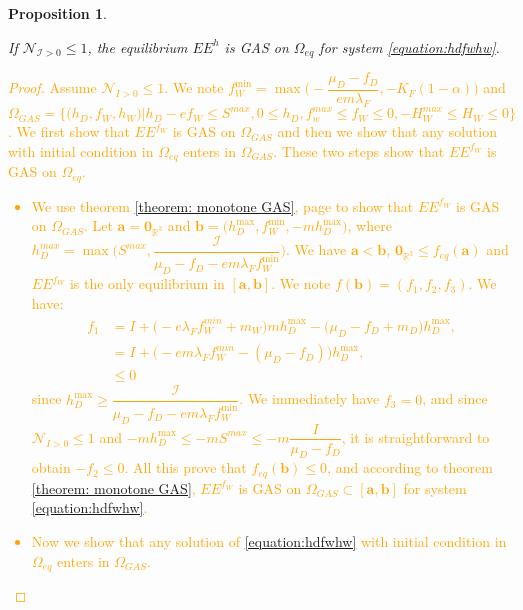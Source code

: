 \documentclass{article}
\newcommand{\lfw}{\lambda_{F}}
\newcommand{\lfw}{\lambda_{F}}
\newcommand{\cI}{\mathcal{I}}
\newcommand{\R}{\mathbb{R}}
\newcommand{\N}{\mathcal{N}}
\newcommand{\vdeux}[1]{\textcolor{orange}{#1}}
\newtheorem{prop}[theorem]{Proposition}
\theoremstyle{definition}
\theoremstyle{remark}
\begin{document}





\begin{prop}\label{prop:EEHGAS}

If $\mathcal{N}_{\cI > 0} \leq 1$, the equilibrium $EE^{h}$ is GAS on $\Omega_{eq}$ for system \eqref{equation:hdfwhw}.
\end{prop}

\vdeux{
\begin{proof}
Assume $\N_{I> 0} \leq 1$.
We note $f_W^{\min} = \max\Big(-\dfrac{\mu_D - f_D}{e m \lfw}, -K_F(1-\alpha)\Big)$ and $\Omega_{GAS}=\Big\{\Big(h_D, f_W, h_W \Big)  \Big|h_D - ef_W \leq S^{max}, 0 \leq h_D,  f_w^{max} \leq f_W \leq 0, -H_W^{max}\leq  H_W \leq 0 \Big\}$. We first show that $EE^{f_W}$ is GAS on $\Omega_{GAS}$ and then we show that any solution with initial condition in $\Omega_{eq}$ enters in $ \Omega_{GAS}$. These two steps show that $EE^{f_W}$ is GAS on $\Omega_{eq}$.
\begin{itemize}
\item We use theorem \ref{theorem: monotone GAS}, page \pageref{theorem: monotone GAS} to show that $EE^{f_W}$ is GAS on $\Omega_{GAS}$. Let $\mathbf{a} = \mathbf{0}_{\R^3}$ and $\mathbf{b} = \Big(h_D^{\max}, f_W^{\min}, -mh_D^{\max} \Big)$, where $h_D^{max} = \max\Big(S^{max}, \dfrac{\cI}{\mu_D - f_D - e m \lfw f^{\min}_W}\Big)$. We have $\mathbf{a} < \mathbf{b}$, $\mathbf{0}_{\R^3} \leq f_{eq}(\mathbf{a})$ and $EE^{f_W}$ is the only equilibrium in $[\mathbf{a}, \mathbf{b}]$. We note $f(\mathbf{b}) = (f_1, f_2, f_3)$. We have:
\begin{align*}
f_1 &= I + \Big(-e\lfw f_W^{min} + m_W\Big)mh_D^{\max} - \Big(\mu_D - f_D + m_D\Big) h_D^{\max}, \\
&= I + \Big(-e m \lfw f_W^{min} - (\mu_D - f_D) \Big)h_D^{\max}, \\
& \leq 0
\end{align*}
since $h_D^{\max} \geq \dfrac{\cI}{\mu_D - f_D - e m \lfw f^{\min}_W}$. We immediately have $f_3 = 0$, and since $\N_{I>0} \leq 1$ and $-m h_D^{\max} \leq -mS^{max} \leq -m\dfrac{I}{\mu_D -f_D}$, it is straightforward to obtain $-f_2 \leq 0$. All this prove that $f_{eq}(\mathbf{b}) \leq 0$, and according to theorem \ref{theorem: monotone GAS}, $EE^{f_W}$ is GAS on $ \Omega_{GAS} \subset [\mathbf{a}, \mathbf{b}]$ for system \eqref{equation:hdfwhw}.
\item Now we show that any solution of \eqref{equation:hdfwhw} with initial condition in $\Omega_{eq}$ enters in $\Omega_{GAS}$. 

\end{itemize}
\end{proof}}
\end{document}
